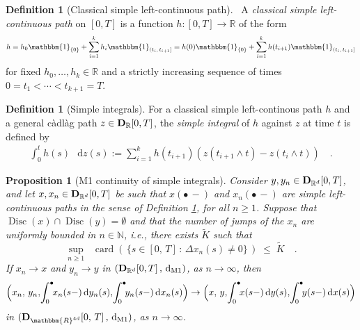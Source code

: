 \documentclass[11pt]{article}
\newtheorem{prop}[theorem]{Proposition}
\theoremstyle{definition}\newtheorem{example}[theorem]{Example}
\theoremstyle{definition}\newtheorem{counterexample}[theorem]{Counterexample}
\theoremstyle{definition}\newtheorem{remark}[theorem]{Remark}
\theoremstyle{definition}\newtheorem{defi}[theorem]{Definition}
\numberwithin{equation}{section}
\newcommand{\N}{\mathbb{N}}
\newcommand{\R}{\mathbb{R}}
\newcommand{\D}{{\bf D}}											%
\newcommand*\diff{\mathop{}\!\mathrm{d}}								%
\renewcommand{\sup}[1]{\underset{#1}{\operatorname{sup}}\;}					%
\renewcommand{\|}{\; : \, \;}											%
\newcommand{\dM}{\diff_{\operatorname{M1}}}							%
\begin{document}
\begin{defi}[Classical simple left-continuous path]\ \label{eq:ClassicalLeftContinuousPaths} 
	A \textit{classical simple left-continuous path} on $[0,T]$ is a function $h: [0,T] \to \R$ of the form
	\begin{align*}
		h = h_0 \mathbbm{1}_{\{0\}} + \sum_{i=1}^k h_i\mathbbm{1}_{(t_i, \,t_{i+1}]} = h(0) \mathbbm{1}_{\{0\}} + \sum_{i=1}^k h(t_{i+1})\mathbbm{1}_{(t_i, \,t_{i+1}]}
	\end{align*}
	for fixed $h_0,\ldots,h_{k} \in \mathbb{R}$ and a strictly increasing sequence of times $0 = t_1  < \cdots < t_{k+1} = T $.
\end{defi}

\begin{defi}[Simple integrals]\label{defn:simple_integrals} 
	For a classical simple left-continous path $h$ and a general càdlàg path $z \in \D_\R[0,T]$, the \textit{simple integral} of $h$ against $z$ at time $t$ is defined by
	\begin{align*}
		\int_0^t h(s) \, \diff z(s) := \sum_{i=1}^k h(t_{i+1})(z(t_{i+1} \wedge t) - z(t_i \wedge t)) \quad .
	\end{align*}
\end{defi}


\begin{prop}[M1 continuity of simple integrals]\label{thm:ContinuityOfSimpleIntegralsInM1Topology} 
	Consider $y, y_n \in \D_{\R^d}[0,T]$, and let $x, x_n\in\D_{\R^d}[0,T]$ be such that $x(\bullet\, -)$ and $x_n(\bullet \, -)$ are simple left-continuous paths in the sense of Definition \ref{eq:ClassicalLeftContinuousPaths}, for all $n\ge 1$. Suppose that $\operatorname{Disc}(x) \cap \operatorname{Disc}(y) = \emptyset$ and that the number of jumps of the $x_n$ are uniformly bounded in $n \in \N$, i.e., there exists $\tilde{K}$ such that 
	$$ \sup{n \geq 1} \; \operatorname{card}(\, \{s \in [0,\, T]\, : \, \Delta x_n(s) \neq 0\}\, ) \; \leq \; \tilde{K} \quad .$$
	If $x_n\to x$ and $y_n \to y$ in $(\D_{\R^d}[0,T]\, ,\, \dM )$, as $n\to \infty$, then
	$$\Bigl(x_n, \,y_n,\!\int_0^\bullet \!\!x_n(s-) \diff y_n(s),\!\int_0^\bullet \!\!y_n(s-) \diff x_n(s)\Bigr) \rightarrow  \Bigl(x, \,y,\!\int_0^\bullet\!\! x(s-)\diff y(s),\!\int_0^\bullet \!\! y(s-)\diff x(s)\Bigr)$$
	in $(\D_{\mathbbm{R}^{4d}}[0,\,T]\, , \,\diff_{\operatorname{M1}})$, as $n\rightarrow\infty$.
\end{prop}
\end{document}

